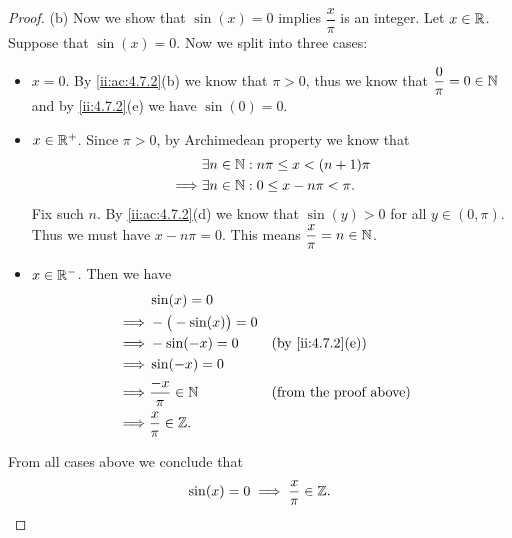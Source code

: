 \begin{proof}{(b)}
  Now we show that \(\sin(x) = 0\) implies \(\dfrac{x}{\pi}\) is an integer.
  Let \(x \in \mathbb{R}\).
  Suppose that \(\sin(x) = 0\).
  Now we split into three cases:
  \begin{itemize}
    \item \(x = 0\).
          By \cref{ii:ac:4.7.2}(b) we know that \(\pi > 0\), thus we know that \(\dfrac{0}{\pi} = 0 \in \mathbb{N}\) and by \cref{ii:4.7.2}(e) we have \(\sin(0) = 0\).
    \item \(x \in \mathbb{R}^+\).
          Since \(\pi > 0\), by Archimedean property we know that
          \begin{align*}
                     & \exists n \in \mathbb{N} : n \pi \leq x < (n + 1) \pi \\
            \implies & \exists n \in \mathbb{N} : 0 \leq x - n \pi < \pi.
          \end{align*}
          Fix such \(n\).
          By \cref{ii:ac:4.7.2}(d) we know that \(\sin(y) > 0\) for all \(y \in (0, \pi)\).
          Thus we must have \(x - n \pi = 0\).
          This means \(\dfrac{x}{\pi} = n \in \mathbb{N}\).
    \item \(x \in \mathbb{R}^-\).
          Then we have
          \begin{align*}
                     & \sin(x) = 0                                                \\
            \implies & -\big(-\sin(x)\big) = 0                                    \\
            \implies & -\sin(-x) = 0           &  & \by{ii:4.7.2}[e]              \\
            \implies & \sin(-x) = 0                                               \\
            \implies & \dfrac{-x}{\pi} \in \N  &  & \text{(from the proof above)} \\
            \implies & \dfrac{x}{\pi} \in \Z.
          \end{align*}
  \end{itemize}
  From all cases above we conclude that
  \[
    \sin(x) = 0 \implies \dfrac{x}{\pi} \in \mathbb{Z}.
  \]
\end{proof}

